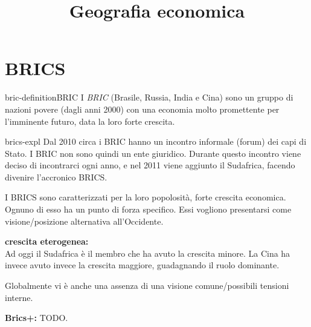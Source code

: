 \documentclass[preview]{standalone}
\begin{document}
\title{Geografia economica}
\genpage

\section{BRICS}

\begin{snippetdefinition}{bric-definition}{BRIC}
    I \textit{BRIC} (Brasile, Russia, India e Cina)
    sono un gruppo di nazioni povere (dagli anni 2000) con una economia
    molto promettente per l'imminente futuro, data la loro forte crescita. 
\end{snippetdefinition}

\begin{snippet}{brics-expl}
    Dal 2010 circa i BRIC hanno un incontro informale (forum) dei capi di Stato.
    I BRIC non sono quindi un ente giuridico.
    Durante questo incontro viene deciso di incontrarci ogni anno, e nel 2011 viene aggiunto il Sudafrica,
    facendo divenire l'accronico BRICS.
    
    I BRICS sono caratterizzati per la loro popolosità, forte crescita economica.
    Ognuno di esso ha un punto di forza specifico.
    Essi vogliono presentarsi come visione/posizione alternativa all'Occidente.
    
    \textbf{crescita eterogenea:} \\
    Ad oggi il Sudafrica è il membro che ha avuto la crescita minore.
    La Cina ha invece avuto invece la crescita maggiore, guadagnando il ruolo dominante.
    
    Globalmente vi è anche una assenza di una visione comune/possibili tensioni interne.
    
    \textbf{Brics+:} TODO.
\end{snippet}
\end{document}
